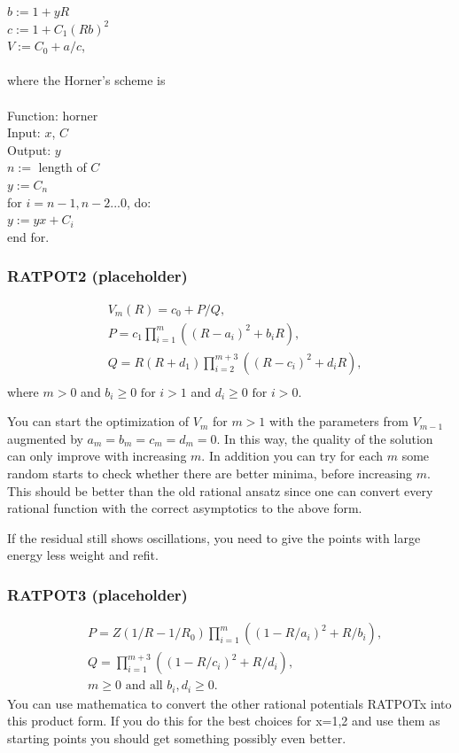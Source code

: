 \documentclass[12pt]{article}
\def\spc{\hspace*{0.5cm}} 			%
\begin{document}
$b := 1 + yR$\\
$c := 1 + C_1(Rb)^2$\\
$V := C_0 + a/c$, \\
\\
where the Horner's scheme is
\\
\\
Function: horner \\
Input: $x$, $C$ \\
Output: $y$ \\
$n := $ length of $C$ \\
$y := C_n$ \\
for $i=n-1, n-2 ... 0$, do: \\
\spc $y := yx + C_i$ \\
end for.


\subsubsection{RATPOT2 (placeholder)}
\begin{equation}
    \begin{split}
        &V_m(R)=c_0+P/Q, \\
        &P=c_1\prod_{i=1}^m ((R-a_i)^2+b_i R), \\
        &Q=R(R+d_1)\prod_{i=2}^{m+3}((R-c_i)^2+d_i R), \\
    \end{split}
    \label{eq:ratpot2}
\end{equation}
where
$m>0$ and $b_i \ge 0 \text{ for } i>1$ and $d_i \ge 0 \text{ for } i>0$.

You can start the optimization of $V_m$ for $m>1$ with the parameters from $V_{m-1}$ augmented by $a_m=b_m=c_m=d_m=0$. In this way, the quality of the solution can only improve with increasing $m$. In addition you can try for each $m$ some random starts to check whether there are better minima, before increasing $m$. This should be better than the old rational ansatz since one can convert every rational function with the correct asymptotics to the above form.

If the residual still shows oscillations, you need to give the points with large energy less weight and refit.


\subsubsection{RATPOT3 (placeholder)}
\begin{equation}
    \begin{split}
        &P=Z(1/R-1/R_0)\prod_{i=1}^m ((1-R/a_i)^2+R/b_i), \\
        &Q=\prod_{i=1}^{m+3} ((1-R/c_i)^2+R/d_i), \\
        &m\ge 0 \text{ and all } b_i, d_i \ge 0.
    \end{split}
\end{equation}
You can use mathematica to convert the other rational potentials RATPOTx into this product form. If you do this for the best choices for x=1,2 and use them as starting points you should get something possibly even better.
\end{document}
